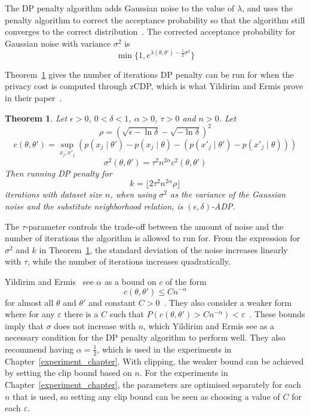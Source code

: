 \documentclass[english,twoside,openright]{HYgraduMLDS}
\newtheorem{theorem}{Theorem}
\begin{document}
The DP penalty algorithm adds Gaussian noise to the value of \(\lambda\), and 
uses the penalty algorithm to correct the acceptance probability so that 
the algorithm still converges to the correct distribution~\cite{YildirimE19}.
The corrected acceptance probability for Gaussian noise with variance 
\(\sigma^2\) is 
\[
    \min\{1, e^{\lambda(\theta, \theta') - \frac{1}{2}\sigma^2}\}
\]

Theorem~\ref{DP_penalty_theorem_zcdp} gives the number of iterations DP penalty 
can be run for when the privacy cost is computed through zCDP, which is 
what Yildirim and Ermis prove in their paper~\cite{YildirimE19}.

\begin{theorem}\label{DP_penalty_theorem_zcdp}
  Let \(\epsilon > 0\), \(0 < \delta < 1\), \(\alpha > 0\), \(\tau > 0\) and
  \(n > 0\).
    Let
    \[
        \rho = (\sqrt{\epsilon - \ln \delta} - \sqrt{-\ln \delta})^2
    \]
    \[
        c(\theta, \theta') = \sup_{x_j, x'_j} (p(x_j\mid \theta') - p(x_j\mid \theta) 
        - (p(x'_j\mid \theta') - p(x'_j\mid \theta)))
    \]
    \[
        \sigma^2(\theta, \theta') = \tau^2 n^{2\alpha}c^2(\theta, \theta')
    \]
    Then running DP penalty for
    \[
        k = \lfloor 2\tau^2 n^{2\alpha} \rho\rfloor
    \]
    iterations with dataset size \(n\), when using \(\sigma^2\) as the
    variance of the Gaussian noise
    and the substitute neighborhood relation, is \((\epsilon, \delta)\)-ADP.
\end{theorem}

The \(\tau\)-parameter controls the trade-off between the amount of noise
and the number of iterations the algorithm is allowed to run for. From the
expression for \(\sigma^{2}\) and \(k\) in Theorem~\ref{DP_penalty_theorem_zcdp},
the standard deviation of the noise increases linearly with \(\tau\), while
the number of iterations increases quadratically.

Yildirim and Ermis~\cite{YildirimE19} see \(\alpha\) as a bound on \(c\) of the
form
\[
  c(\theta, \theta') \leq Cn^{-\alpha}
\]
for almost all \(\theta\) and \(\theta'\) and constant
\(C > 0\)~\cite[Assumption A1]{YildirimE19}.
They also consider a weaker form where for any \(\varepsilon\) there is
a \(C\) such that
\(P(c(\theta, \theta') > Cn^{-\alpha}) < \varepsilon\)~\cite[Assumption A4]{YildirimE19}.
These bounds imply that \(\sigma\)
does not increase with \(n\), which Yildirim and Ermis see as a necessary
condition for the DP penalty algorithm to perform well. They also recommend
having \(\alpha = \frac{1}{2}\), which is used in the experiments in
Chapter~\ref{experiment_chapter}.
With clipping, the weaker bound can be achieved by setting the clip bound based
on \(n\). For the experiments
in Chapter~\ref{experiment_chapter}, the parameters are optimised separately
for each \(n\) that is used, so setting any clip bound can be seen as
choosing a value of \(C\) for each \(\varepsilon\).
\end{document}
